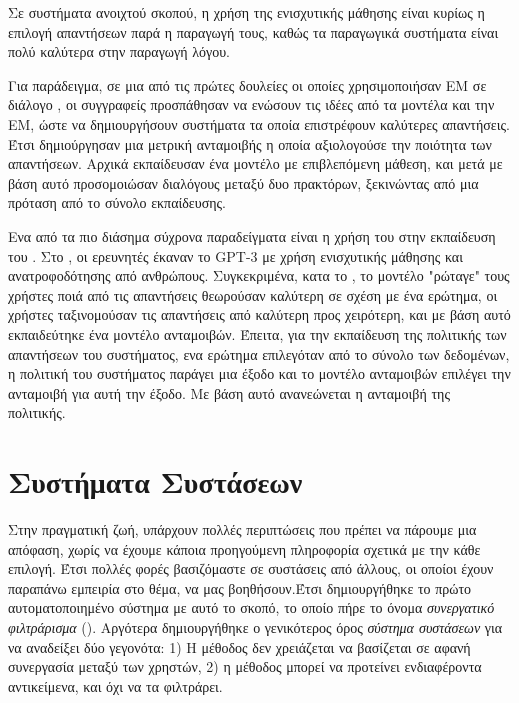 Σε συστήματα ανοιχτού σκοπού, η χρήση της ενισχυτικής μάθησης είναι κυρίως η επιλογή απαντήσεων παρά η παραγωγή τους, καθώς τα παραγωγικά  συστήματα είναι πολύ καλύτερα στην παραγωγή λόγου.

Για παράδειγμα, σε μια από τις πρώτες δουλείες οι οποίες χρησιμοποιήσαν ΕΜ σε διάλογο \cite{rl_dialogue_2016}, οι συγγραφείς προσπάθησαν να ενώσουν τις ιδέες από τα  μοντέλα και την ΕΜ, ώστε να δημιουργήσουν συστήματα τα οποία επιστρέφουν καλύτερες απαντήσεις. Έτσι δημιούργησαν μια μετρική ανταμοιβής η οποία αξιολογούσε την ποιότητα των απαντήσεων. Αρχικά εκπαίδευσαν ένα  μοντέλο με επιβλεπόμενη μάθεση, και μετά με βάση αυτό προσομοιώσαν διαλόγους μεταξύ δυο πρακτόρων, ξεκινώντας από μια πρόταση από το σύνολο εκπαίδευσης.

Ενα από τα πιο διάσημα σύχρονα παραδείγματα είναι η χρήση του στην εκπαίδευση του . Στο \cite{chatgpt_2022}, οι ερευνητές έκαναν  το {GPT-3} με χρήση ενισχυτικής μάθησης και ανατροφοδότησης από ανθρώπους. Συγκεκριμένα, κατα το , το μοντέλο "ρώταγε" τους χρήστες ποιά από τις απαντήσεις θεωρούσαν καλύτερη σε σχέση με ένα ερώτημα, οι χρήστες ταξινομούσαν τις απαντήσεις από καλύτερη προς χειρότερη, και με βάση αυτό εκπαιδεύτηκε ένα μοντέλο ανταμοιβών. Έπειτα, για την εκπαίδευση της πολιτικής των απαντήσεων του συστήματος, ενα ερώτημα επιλεγόταν από το σύνολο των δεδομένων, η πολιτική του συστήματος παράγει μια έξοδο και το μοντέλο ανταμοιβών επιλέγει την ανταμοιβή για αυτή την έξοδο. Με βάση αυτό ανανεώνεται η ανταμοιβή της πολιτικής.

\section{Συστήματα Συστάσεων}

Στην πραγματική ζωή, υπάρχουν πολλές περιπτώσεις που πρέπει να πάρουμε μια απόφαση, χωρίς να έχουμε κάποια προηγούμενη πληροφορία σχετικά με την κάθε επιλογή. Έτσι πολλές φορές βασιζόμαστε σε συστάσεις από άλλους, οι οποίοι έχουν παραπάνω εμπειρία στο θέμα, να μας βοηθήσουν.Έτσι δημιουργήθηκε το πρώτο αυτοματοποιημένο σύστημα με αυτό το σκοπό, το οποίο πήρε το όνομα \textit{συνεργατικό φιλτράρισμα} (). Αργότερα δημιουργήθηκε ο γενικότερος όρος \textit{σύστημα συστάσεων} για να αναδείξει δύο γεγονότα: 1) Η μέθοδος δεν χρειάζεται να βασίζεται σε αφανή συνεργασία μεταξύ των χρηστών, 2) η μέθοδος μπορεί να προτείνει ενδιαφέροντα αντικείμενα, και όχι να τα φιλτράρει.

